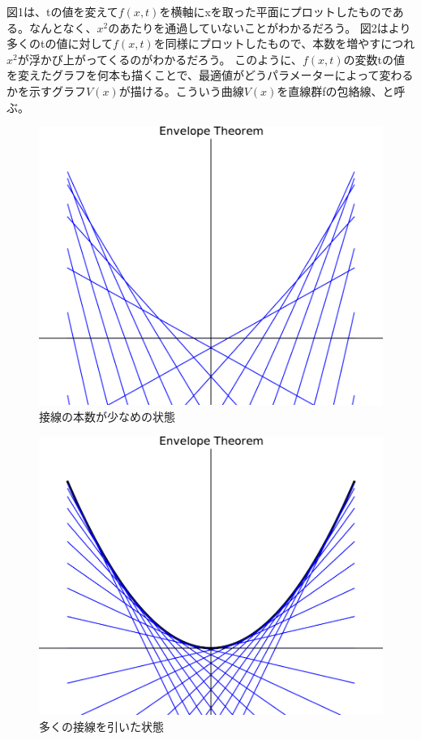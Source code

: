 \documentclass[11pt,a4j,fleqn]{jarticle}
\begin{document}
図1は、tの値を変えて$f(x,t)$を横軸にxを取った平面にプロットしたものである。なんとなく、$x^2$のあたりを通過していないことがわかるだろう。
図2はより多くのtの値に対して$f(x,t)$を同様にプロットしたもので、本数を増やすにつれ$x^2$が浮かび上がってくるのがわかるだろう。
このように、$f(x,t)$の変数tの値を変えたグラフを何本も描くことで、最適値がどうパラメーターによって変わるかを示すグラフ$V(x)$が描ける。こういう曲線$V(x)$を直線群fの包絡線、と呼ぶ。



\begin{figure}[H]
\begin{center}
\includegraphics[scale=0.5]{envelope1.pdf}
\end{center}
\caption{接線の本数が少なめの状態}
\label{fig:1}
\end{figure}

\begin{figure}[H]
\begin{center}
\includegraphics[scale=0.5]{envelope0.pdf}
\end{center}
\caption{多くの接線を引いた状態}
\label{fig:2}
\end{figure}
\end{document}

